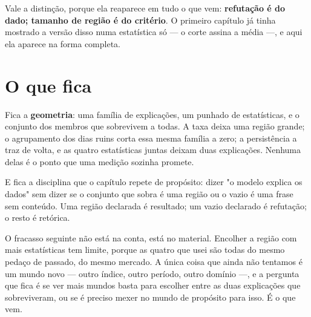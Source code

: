 Vale a distinção, porque ela reaparece em tudo o que vem: \textbf{refutação é do dado; tamanho de
região é do critério}. O primeiro capítulo já tinha mostrado a versão disso numa estatística só
--- o corte assina a média ---, e aqui ela aparece na forma completa.

\section{O que fica}

Fica a \textbf{geometria}: uma família de explicações, um punhado de estatísticas, e o conjunto
dos membros que sobrevivem a todas. A taxa deixa uma região grande; o agrupamento dos dias ruins
corta essa mesma família a zero; a persistência a traz de volta, e as quatro estatísticas juntas
deixam duas explicações. Nenhuma delas é o ponto que uma medição sozinha promete.

E fica a disciplina que o capítulo repete de propósito: dizer "o modelo explica os dados" sem
dizer se o conjunto que sobra é uma região ou o vazio é uma frase sem conteúdo. Uma região
declarada é resultado; um vazio declarado é refutação; o resto é retórica.

O fracasso seguinte não está na conta, está no material. Encolher a região com mais estatísticas
tem limite, porque as quatro que usei são todas do mesmo pedaço de passado, do mesmo mercado. A
única coisa que ainda não tentamos é um mundo novo --- outro índice, outro período, outro
domínio ---, e a pergunta que fica é se ver mais mundos basta para escolher entre as duas
explicações que sobreviveram, ou se é preciso mexer no mundo de propósito para isso. É o que vem.
